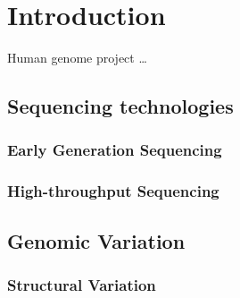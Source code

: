 \chapter{Introduction} 
Human genome project \ldots
\newpage
\section{Sequencing technologies}
\subsection{Early Generation Sequencing}
\subsection{High-throughput Sequencing}
\section{Genomic Variation}
\subsection{Structural Variation}
\newpage
